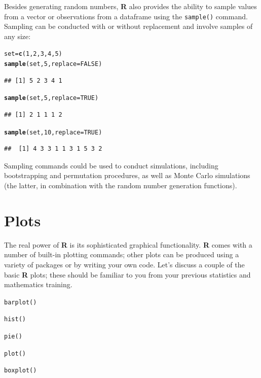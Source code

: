 \documentclass[12pt]{article}\usepackage[]{graphicx}\usepackage[]{color}
\makeatletter
\newcommand{\hlnum}[1]{\textcolor[rgb]{0.686,0.059,0.569}{#1}}%
\newcommand{\hlstd}[1]{\textcolor[rgb]{0.345,0.345,0.345}{#1}}%
\newcommand{\hlkwb}[1]{\textcolor[rgb]{0.69,0.353,0.396}{#1}}%
\newcommand{\hlkwc}[1]{\textcolor[rgb]{0.333,0.667,0.333}{#1}}%
\newcommand{\hlkwd}[1]{\textcolor[rgb]{0.737,0.353,0.396}{\textbf{#1}}}%
\newenvironment{kframe}{%
 \def\at@end@of@kframe{}%
 \ifinner\ifhmode%
  \def\at@end@of@kframe{\end{minipage}}%
  \begin{minipage}{\columnwidth}%
 \fi\fi%
 \def\FrameCommand##1{\hskip\@totalleftmargin \hskip-\fboxsep
 \colorbox{shadecolor}{##1}\hskip-\fboxsep
     \hskip-\linewidth \hskip-\@totalleftmargin \hskip\columnwidth}%
 \MakeFramed {\advance\hsize-\width
   \@totalleftmargin\z@ \linewidth\hsize
   \@setminipage}}%
 {\par\unskip\endMakeFramed%
 \at@end@of@kframe}
\newenvironment{knitrout}{}{} %
\makeatother
\begin{document}
Besides generating random numbers, \textbf{R} also provides the ability to sample values from a vector or observations from a dataframe using the \verb|sample()| command. Sampling can be conducted with or without replacement and involve samples of any size:
\begin{knitrout}
\color{fgcolor}\begin{kframe}
\begin{alltt}
\hlstd{set} \hlkwb{=} \hlkwd{c}\hlstd{(}\hlnum{1}\hlstd{,} \hlnum{2}\hlstd{,} \hlnum{3}\hlstd{,} \hlnum{4}\hlstd{,} \hlnum{5}\hlstd{)}
\hlkwd{sample}\hlstd{(set,} \hlnum{5}\hlstd{,} \hlkwc{replace} \hlstd{=} \hlnum{FALSE}\hlstd{)}
\end{alltt}
\begin{verbatim}
## [1] 5 2 3 4 1
\end{verbatim}
\begin{alltt}
\hlkwd{sample}\hlstd{(set,} \hlnum{5}\hlstd{,} \hlkwc{replace} \hlstd{=} \hlnum{TRUE}\hlstd{)}
\end{alltt}
\begin{verbatim}
## [1] 2 1 1 1 2
\end{verbatim}
\begin{alltt}
\hlkwd{sample}\hlstd{(set,} \hlnum{10}\hlstd{,} \hlkwc{replace} \hlstd{=} \hlnum{TRUE}\hlstd{)}
\end{alltt}
\begin{verbatim}
##  [1] 4 3 3 1 1 3 1 5 3 2
\end{verbatim}
\end{kframe}
\end{knitrout}


Sampling commands could be used to conduct simulations, including bootstrapping and permutation procedures, as well as Monte Carlo simulations (the latter, in combination with the random number generation functions).

\section{Plots}\label{sec:plots}
The real power of \textbf{R} is its sophisticated graphical functionality. \textbf{R} comes with a number of built-in plotting commands; other plots can be produced using a variety of packages or by writing your own code. Let's discuss a couple of the basic \textbf{R} plots; these should be familiar to you from your previous statistics and mathematics training.
\begin{itemize*}
\item \verb|barplot()|
\item \verb|hist()|
\item \verb|pie()|
\item \verb|plot()|
\item \verb|boxplot()|
\end{itemize*}
\end{document}
